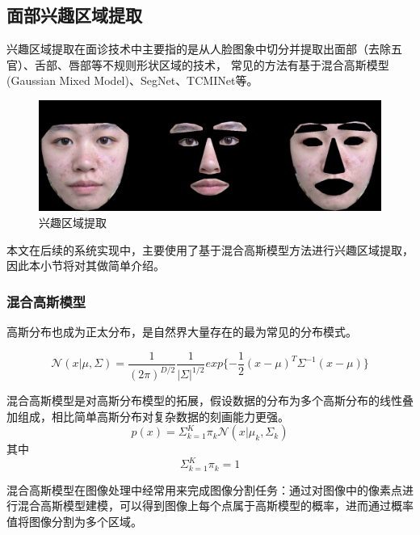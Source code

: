 \subsection{面部兴趣区域提取}
兴趣区域提取在面诊技术中主要指的是从人脸图象中切分并提取出面部（去除五官）、舌部、唇部等不规则形状区域的技术，
常见的方法有基于混合高斯模型(Gaussian Mixed Model)\cite{Hu2016Robust}、SegNet\cite{Badrinarayanan2017SegNet}、TCMINet\cite{li2020tcminet}等。
\begin{figure}[h]
    \centering
    \includegraphics[width=12cm]{images/roi.png}
    \caption{兴趣区域提取}
    \label{fig:roi}
\end{figure}
本文在后续的系统实现中，主要使用了基于混合高斯模型方法进行兴趣区域提取，因此本小节将对其做简单介绍。


\subsubsection{混合高斯模型}
高斯分布也成为正太分布，是自然界大量存在的最为常见的分布模式。

\begin{equation}
    \mathcal{N}(x | \mu, \Sigma) = \frac{1}{(2\pi)^{D/2}}\frac{1}{|\Sigma|^{1/2}}exp\{-\frac{1}{2}(x-\mu)^T\Sigma^{-1}(x-\mu)\}
\end{equation}

混合高斯模型是对高斯分布模型的拓展，假设数据的分布为多个高斯分布的线性叠加组成，相比简单高斯分布对复杂数据的刻画能力更强。
\begin{equation}
p(x) = \Sigma^K_{k=1}\pi_k\mathcal{N}(x|\mu_k,\Sigma_k)
\end{equation}
其中
\begin{equation}
\Sigma^K_{k=1}\pi_k = 1
\end{equation}

混合高斯模型在图像处理中经常用来完成图像分割任务：通过对图像中的像素点进行混合高斯模型建模，可以得到图像上每个点属于高斯模型的概率，进而通过概率值将图像分割为多个区域。

